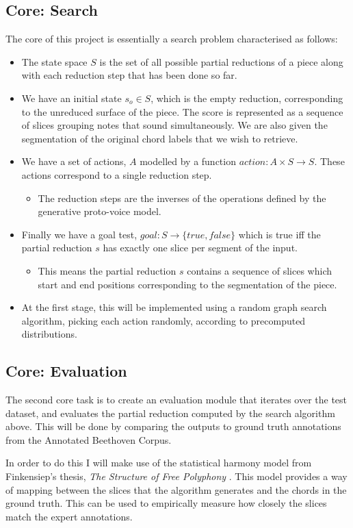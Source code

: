 \documentclass{article}
\begin{document}
\subsection{Core: Search}
The core of this project is essentially a search problem characterised as follows:
\begin{itemize}
  \item The state space $S$ is the set of all possible partial reductions of a piece along with each reduction step that has been done so far. 
  \item We have an initial state $s_o \in S$, which is the empty reduction, corresponding to the unreduced surface of the piece. The score is represented as a sequence of slices grouping notes that sound simultaneously. We are also given the segmentation of the original chord labels that we wish to retrieve.
  \item We have a set of actions, $A$ modelled by a function $action: A \times S \to S$. These actions correspond to a single reduction step.
    \begin{itemize}
      \item The reduction steps are the inverses of the operations defined by the generative proto-voice model.
    \end{itemize}
  \item Finally we have a goal test, $goal: S \to \{true,false\}$ which is true iff the partial reduction $s$ has exactly one slice per segment of the input.
    \begin {itemize}
  \item This means the partial reduction $s$ contains a sequence of slices which start and end positions corresponding to the segmentation of the piece.
    \end {itemize}
  \item At the first stage, this will be implemented using a random graph search algorithm, picking each action randomly, according to precomputed distributions.
\end{itemize}
\par

\subsection{Core: Evaluation}

The second core task is to create an evaluation module that iterates over the test dataset, and evaluates the partial reduction computed by the search algorithm above. This will be done by comparing the outputs to ground truth annotations from the Annotated Beethoven Corpus.
\par
In order to do this I will make use of the statistical harmony model from Finkensiep's thesis, \textit{The Structure of Free Polyphony} \cite{finkensiepStructureFreePolyphony2023}. This model provides a way of mapping between the slices that the algorithm generates and the chords in the ground truth. This can be used to empirically measure how closely the slices match the expert annotations.   
\par
\end{document}
